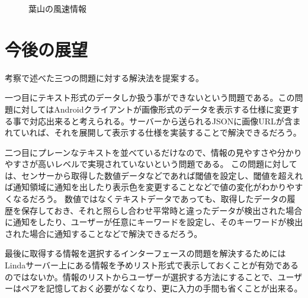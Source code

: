 \begin{figure}[htbp]
  \begin{minipage}{\hsize}
    \begin{center}
    \end{center}
    \caption{葉山の風速情報}
    \label{fig:hayama_wind}
  \end{minipage}
\end{figure}

\section{今後の展望}

考察で述べた三つの問題に対する解決法を提案する。

一つ目にテキスト形式のデータしか扱う事ができないという問題である。この問題に対してはAndroidクライアントが画像形式のデータを表示する仕様に変更する事で対応出来ると考えられる。サーバーから送られるJSONに画像URLが含まれていれば、それを展開して表示する仕様を実装することで解決できるだろう。

二つ目にプレーンなテキストを並べているだけなので、情報の見やすさや分かりやすさが高いレベルで実現されていないという問題である。
この問題に対しては、センサーから取得した数値データなどであれば閾値を設定し、閾値を超えれば通知領域に通知を出したり表示色を変更することなどで値の変化がわかりやすくなるだろう。
数値ではなくテキストデータであっても、取得したデータの履歴を保存しておき、それと照らし合わせ平常時と違ったデータが検出された場合に通知をしたり、ユーザーが任意にキーワードを設定し、そのキーワードが検出された場合に通知することなどで解決できるだろう。

最後に取得する情報を選択するインターフェースの問題を解決するためにはLindaサーバー上にある情報を予めリスト形式で表示しておくことが有効であるのではないか。情報のリストからユーザーが選択する方法にすることで、ユーザーはペアを記憶しておく必要がなくなり、更に入力の手間も省くことが出来る。
